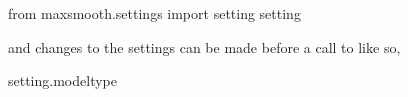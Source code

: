 \documentclass[letterpaper,10pt,english]{sphinxmanual}
\begin{document}
\begin{sphinxVerbatim}[commandchars=\\\{\}]
from maxsmooth.settings import setting
  setting
\end{sphinxVerbatim}

and changes to the settings can be made before a call to 
like so,

\begin{sphinxVerbatim}[commandchars=\\\{\}]
setting.model\PYGZus{}type  
\end{sphinxVerbatim}
\end{document}
